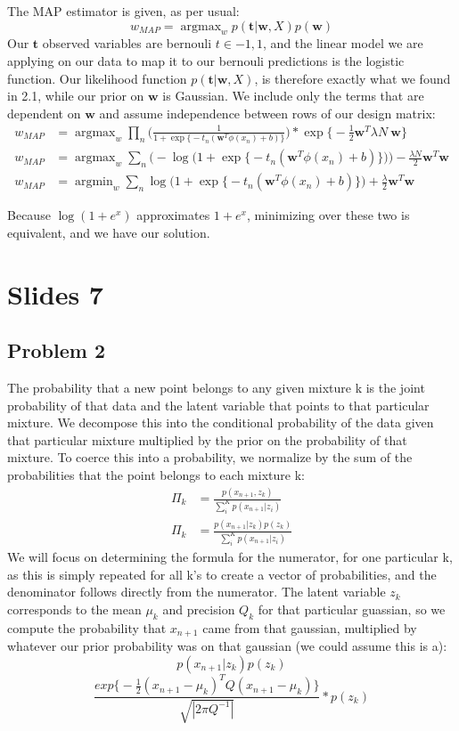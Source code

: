 \documentclass[a4paper,12pt]{article}\usepackage[]{graphicx}\usepackage[]{color}
\DeclareMathOperator*{\argmin}{argmin}
\DeclareMathOperator*{\argmax}{argmax}
\begin{document}
The MAP estimator is given, as per usual:
%
$$
w_{MAP} = \argmax_w p( \bm{t} | \bm{w}, X)p(\bm{w})
$$
%
Our $\bm{t}$ observed variables are bernouli $t \in {-1,1}$, and the linear model we are applying on our data to map it to our bernouli predictions is the logistic function. Our likelihood function $ p( \bm{t} | \bm{w}, X) $, is therefore exactly what we found in 2.1, while our prior on $\bm{w}$ is Gaussian. We include only the terms that are dependent on $\bm{w}$ and assume independence between rows of our design matrix:
%
\begin{align*}
w_{MAP} &= \argmax_w \prod_n \Bigg( \frac{1}{1 + \exp\Big\{ -t_n(\bm{w}^T{\phi}(x_n) + b)  \Big\} } \Bigg) * \exp \Big\{ -\frac{1}{2}\bm{w}^T \lambda N\ \bm{w} \Big\} \\
w_{MAP} &= \argmax_w \sum_n \Big( - \log \Big( 1 + \exp\Big\{  -t_n(\bm{w}^T{\phi}(x_n) + b)  \Big\} \Big)\Big) - \frac{\lambda N}{2}\bm{w}^T \bm{w} \\
w_{MAP} &= \argmin_w \sum_n \log \Big( 1 + \exp\Big\{ -t_n(\bm{w}^T{\phi}(x_n) + b)  \Big\} \Big) + \frac{\lambda }{2} \bm{w}^T \bm{w}
\end{align*}
%

Because $\log(1 + e^x)$ approximates $1 + e^x$, minimizing over these two is equivalent, and we have our solution.

\section*{Slides 7}

\subsection*{Problem 2}

The probability that a new point belongs to any given mixture k is the joint probability of that data and the latent variable that points to that particular mixture. We decompose this into the conditional probability of the data given that particular mixture multiplied by the prior on the probability of that mixture. To coerce this into a probability, we normalize by the sum of the probabilities that the point belongs to each mixture k:
%
\begin{align*}
\Pi_k &= \frac{p(x_{n+1}, z_k)}{\sum_i^K p(x_{n+1} | z_i)} \\
\Pi_k &= \frac{p(x_{n+1} | z_k)p(z_k)}{\sum_i^K p(x_{n+1} | z_i)}
\end{align*}
%
We will focus on determining the formula for the numerator, for one particular k, as this is simply repeated for all k's to create a vector of probabilities, and the denominator follows directly from the numerator. The latent variable $z_k$ corresponds to the mean $\mu_k$ and precision $Q_k$ for that particular guassian, so we compute the probability that $x_{n+1}$ came from that gaussian, multiplied by whatever our prior probability was on that gaussian (we could assume this is a):
%
$$
p(x_{n+1} | z_k)p(z_k)
$$
$$
\frac{exp \Big\{ -\frac{1}{2} (x_{n+1} - \mu_k)^T Q (x_{n+1} - \mu_k) \Big\} }{\sqrt{|2\pi Q^{-1}|}} * p(z_k)
$$
\end{document}
